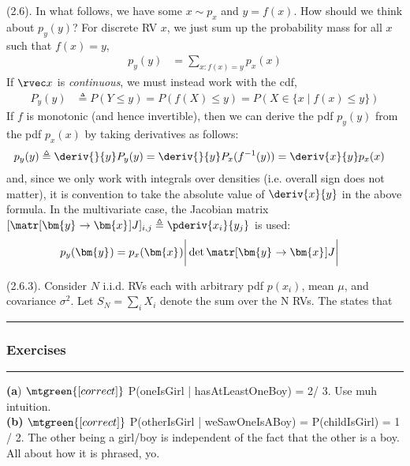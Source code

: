 \documentclass[11pt]{article}
\renewcommand\vec[2][]{\bm{#2}_{#1}}
\newcommand\myspace[1][]{\vspace{#1\bigskipamount}}
\newcommand\p{\Needspace{10\baselineskip} \noindent}
\newcommand\subsub[1]{\Needspace{15\baselineskip}\hrule\subsubsection{#1}\hrule}
\begin{document}
\myspace
\p {} (2.6). In what follows, we have some $ x \sim p_x$ and $ y = f( x)$. How should we think about $p_y( y)$? For discrete RV $ x$, we just sum up the probability mass for all $x$ such that $f(x)=y$,
\begin{align}
	p_y( y)
		&= \sum_{ x: f( x) =  y} p_x( x)
\end{align}
If $\rvec x$ is \textit{continuous}, we must instead work with the cdf,
\begin{align}
	P_y(y)
		&\triangleq P(Y \le y)
		= P(f(X) \le y) 
		= P(X \in \{x \mid f(x) \le y \})
\end{align}
If $f$ is monotonic (and hence invertible), then we can derive the pdf $p_y(y)$ from the pdf $p_x(x)$ by taking derivatives as follows:
\begin{align}
	p_y(y) 
		&\triangleq \deriv{}{y} P_y(y) = \deriv{}{y} P_x(f^{-1}(y)) = \deriv{x}{y} p_x(x)
\end{align} 
and, since we only work with integrals over densities (i.e. overall sign does not matter), it is convention to take the absolute value of $\deriv{x}{y}$ in the above formula. In the multivariate case, the Jacobian matrix $[\matr[\vec y \rightarrow \vec x]{J}]_{i,j} \triangleq \pderiv{x_i}{y_j}$ is used:
\begin{align}
	p_y(\vec y) 
		&= p_x(\vec x) \bigg| \det \matr[\vec y \rightarrow \vec x]{J}  \bigg|
\end{align}

\myspace
\p {} (2.6.3). Consider $N$ i.i.d. RVs each with arbitrary pdf $p(x_i)$, mean $\mu$, and covariance $\sigma^2$. Let $S_N = \sum_i X_i$ denote the sum over the N RVs. The  states that


\myspace
\subsub{Exercises}
\myspace

\begin{example}[Exercise 2.1]
	\textbf{(a}) $\mtgreen{[correct]}$ P(oneIsGirl | hasAtLeastOneBoy) = 2/ 3. Use muh intuition. \\
	
	\textbf{(b)} $\mtgreen{[correct]}$ P(otherIsGirl | weSawOneIsABoy) = P(childIsGirl) = 1 / 2. The other being a girl/boy is independent of the fact that the other is a boy. All about how it is phrased, yo. 
\end{example}
\end{document}

